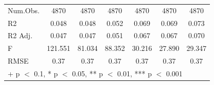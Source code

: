 \documentclass[
]{article}
\begin{document}
\begin{table}
{\begin{tabular}[t]{lcccccc}
\midrule
Num.Obs. & \num{4870} & \num{4870} & \num{4870} & \num{4870} & \num{4870} & \num{4870}\\
R2 & \num{0.048} & \num{0.048} & \num{0.052} & \num{0.069} & \num{0.069} & \num{0.073}\\
R2 Adj. & \num{0.047} & \num{0.047} & \num{0.051} & \num{0.067} & \num{0.067} & \num{0.070}\\
F & \num{121.551} & \num{81.034} & \num{88.352} & \num{30.216} & \num{27.890} & \num{29.347}\\
RMSE & \num{0.37} & \num{0.37} & \num{0.37} & \num{0.37} & \num{0.37} & \num{0.37}\\
\bottomrule
\multicolumn{7}{l}{\rule{0pt}{1em}+ p $<$ 0.1, * p $<$ 0.05, ** p $<$ 0.01, *** p $<$ 0.001}\\
\end{tabular}}
\end{table}
\end{document}
